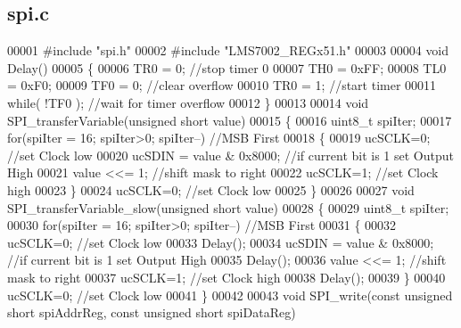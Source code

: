 \subsection{spi.\+c}
\label{spi_8c_source}

\begin{DoxyCode}
00001 \textcolor{preprocessor}{#include "spi.h"}
00002 \textcolor{preprocessor}{#include "LMS7002_REGx51.h"}
00003 
00004 \textcolor{keywordtype}{void} Delay()
00005 \{
00006     TR0 = 0; \textcolor{comment}{//stop timer 0}
00007     TH0 = 0xFF;
00008     TL0 = 0xF0;
00009     TF0 = 0; \textcolor{comment}{//clear overflow}
00010     TR0 = 1; \textcolor{comment}{//start timer}
00011     \textcolor{keywordflow}{while}( !TF0 ); \textcolor{comment}{//wait for timer overflow}
00012 \}
00013 
00014 \textcolor{keywordtype}{void} SPI_transferVariable(\textcolor{keywordtype}{unsigned} \textcolor{keywordtype}{short} value)
00015 \{                                 
00016     uint8\_t spiIter;
00017     \textcolor{keywordflow}{for}(spiIter = 16; spiIter>0; spiIter--) \textcolor{comment}{//MSB First}
00018     \{
00019         ucSCLK=0;   \textcolor{comment}{//set Clock low}
00020         ucSDIN = value & 0x8000; \textcolor{comment}{//if current bit is 1 set Output High}
00021         value <<= 1; \textcolor{comment}{//shift mask to right}
00022         ucSCLK=1;   \textcolor{comment}{//set Clock high}
00023     \}
00024     ucSCLK=0;   \textcolor{comment}{//set Clock low}
00025 \}
00026 
00027 \textcolor{keywordtype}{void} SPI_transferVariable_slow(\textcolor{keywordtype}{unsigned} \textcolor{keywordtype}{short} value)
00028 \{
00029     uint8\_t spiIter;
00030     \textcolor{keywordflow}{for}(spiIter = 16; spiIter>0; spiIter--) \textcolor{comment}{//MSB First}
00031     \{
00032         ucSCLK=0;   \textcolor{comment}{//set Clock low}
00033         Delay();
00034         ucSDIN = value & 0x8000; \textcolor{comment}{//if current bit is 1 set Output High}
00035         Delay();
00036         value <<= 1; \textcolor{comment}{//shift mask to right}
00037         ucSCLK=1;   \textcolor{comment}{//set Clock high}
00038         Delay();
00039     \}
00040     ucSCLK=0;   \textcolor{comment}{//set Clock low}
00041 \}
00042 
00043 \textcolor{keywordtype}{void} SPI_write(\textcolor{keyword}{const} \textcolor{keywordtype}{unsigned} \textcolor{keywordtype}{short} spiAddrReg, \textcolor{keyword}{const} \textcolor{keywordtype}{unsigned} \textcolor{keywordtype}{short} spiDataReg)

\end{DoxyCode}
